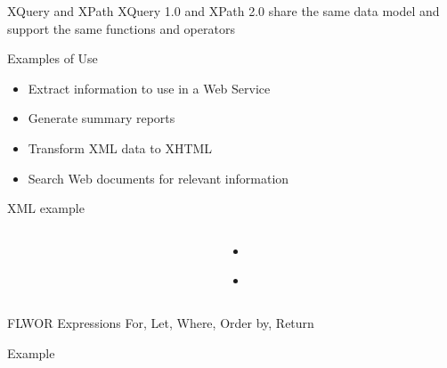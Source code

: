 \documentclass[sans]{beamer}
\begin{document}
\begin{frame}{XQuery and XPath}
	XQuery 1.0 and XPath 2.0 share the same data model and support the same functions and operators

\end{frame}


\begin{frame}{Examples of Use}
	\begin{itemize}
		\item Extract information to use in a Web Service
		\item Generate summary reports
		\item Transform XML data to XHTML
		\item Search Web documents for relevant information
	\end{itemize}
\end{frame}

\begin{frame}{XML example}
	\begin{columns}
		\begin{column}{0.45\linewidth}
			\inputminted[fontsize=\tiny]{xml}{codes/ex2.xml}
		\end{column}
		\begin{column}{0.55\linewidth}
			\begin{itemize}
				\item \inputminted[fontsize=\tiny]{xquery}{codes/ex3.xq}
				\item \inputminted[fontsize=\tiny]{xquery}{codes/ex4.xq}
			\end{itemize}
		\end{column}
	\end{columns}
\end{frame}

\begin{frame}{FLWOR Expressions}
	For, Let, Where, Order by, Return

	\vspace{1cm}

	\begin{block}{Example}
		\inputminted{xquery}{codes/ex5.xq}
	\end{block}
\end{frame}
\end{document}
